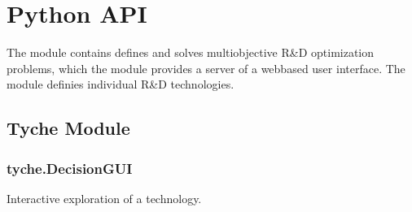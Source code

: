 \documentclass[letterpaper,10pt,english]{sphinxmanual}
\begin{document}
\sphinxstepscope


\chapter{Python API}
\label{\detokenize{modules:python-api}}\label{\detokenize{modules:sec-modules}}\label{\detokenize{modules::doc}}
\sphinxAtStartPar
The module {\hyperref[\detokenize{tyche:module-tyche}]{}} contains defines and solves multi\sphinxhyphen{}objective R\&D
optimization problems, which the module  provides a server
of a web\sphinxhyphen{}based user interface. The module {\hyperref[\detokenize{technology:module-technology}]{}} definies
individual R\&D technologies.

\sphinxstepscope


\section{Tyche Module}
\label{\detokenize{tyche:tyche-module}}\label{\detokenize{tyche::doc}}

\subsection{tyche.DecisionGUI}
\label{\detokenize{tyche:module-tyche.DecisionGUI}}\label{\detokenize{tyche:tyche-decisiongui}}
\sphinxAtStartPar
Interactive exploration of a technology.
\end{document}
